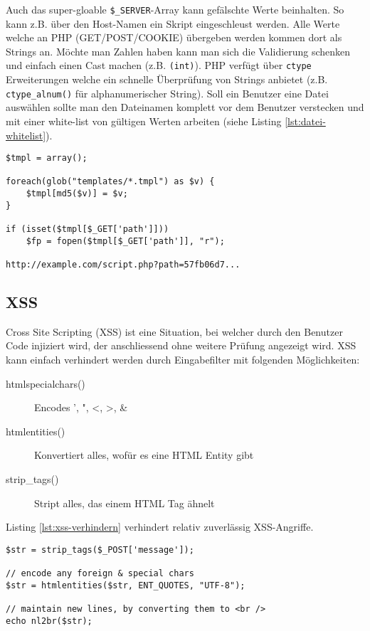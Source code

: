 Auch das super-gloable \verb|$_SERVER|-Array kann gefälschte Werte beinhalten. So kann z.B. über den Host-Namen ein Skript eingeschleust werden.
Alle Werte welche an PHP (GET/POST/COOKIE) übergeben werden kommen dort als Strings an. Möchte man Zahlen haben kann man sich die Validierung schenken und einfach einen Cast machen (z.B. \verb|(int)|). PHP verfügt über \verb|ctype| Erweiterungen welche ein schnelle Überprüfung von Strings anbietet (z.B. \verb|ctype_alnum()| für alphanumerischer String).
Soll ein Benutzer eine Datei auswählen sollte man den Dateinamen komplett vor dem Benutzer verstecken und mit einer white-list von gültigen Werten arbeiten (siehe Listing \ref{lst:datei-whitelist}).  

\begin{lstlisting}[caption=Datei Whitelist, label=lst:datei-whitelist]
$tmpl = array();

foreach(glob("templates/*.tmpl") as $v) {
	$tmpl[md5($v)] = $v;
}

if (isset($tmpl[$_GET['path']]))
	$fp = fopen($tmpl[$_GET['path']], "r");
	
http://example.com/script.php?path=57fb06d7...
\end{lstlisting}

\subsection{XSS}

Cross Site Scripting (XSS) ist eine Situation, bei welcher durch den Benutzer Code injiziert wird, der anschliessend ohne weitere Prüfung angezeigt wird. XSS kann einfach verhindert werden durch Eingabefilter mit folgenden Möglichkeiten:
\begin{description}
	\item[htmlspecialchars()]  Encodes ', ", <, >, \&
	\item[htmlentities()] Konvertiert alles, wofür es eine HTML Entity gibt
	\item[strip\_tags()] Stript alles, das einem HTML Tag ähnelt
\end{description}
Listing \ref{lst:xss-verhindern} verhindert relativ zuverlässig XSS-Angriffe.
\begin{lstlisting}[caption=Verhindern von XSS, label=lst:xss-verhindern]
$str = strip_tags($_POST['message']);

// encode any foreign & special chars
$str = htmlentities($str, ENT_QUOTES, "UTF-8");

// maintain new lines, by converting them to <br />
echo nl2br($str);
\end{lstlisting}

